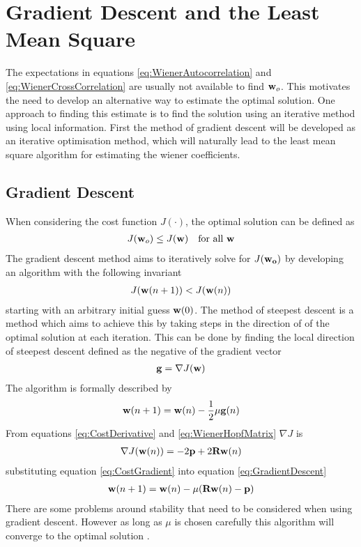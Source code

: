 \section{Gradient Descent and the Least Mean Square}
The expectations in equations \ref{eq:WienerAutocorrelation} %
and \ref{eq:WienerCrossCorrelation} are usually not %
available to find $\bold{w}_{o}$. This motivates the %
need to develop an alternative way to estimate the %
optimal solution. One approach to finding this estimate %
is to find the solution using an iterative method using %
local information. First the method of gradient descent will be %
developed as an iterative optimisation method, which will naturally %
lead to the least mean square algorithm for estimating the wiener %
coefficients. 
\subsection{Gradient Descent}
When considering the cost function $J(\cdot)$, %
the optimal solution can be defined as
\begin{align}
	J(\bold{w}_{o}) \leq J(\bold{w})\quad
	\text{for all }\bold{w}
\end{align}
The gradient descent method aims to iteratively %
solve for $J(\bold{w_{o}})$ by developing an %
algorithm with the following invariant
\begin{align}
	J(\bold{w}(n+1)) < J(\bold{w}(n))
\end{align}
starting with an arbitrary initial guess $\bold{w}(0)$. %
The method of steepest descent is a method which aims %
to achieve this by taking steps in the direction of %
of the optimal solution at each iteration. This can %
be done by finding the local direction of steepest %
descent defined as the negative of the gradient vector %
\begin{align}
	\bold{g} = \nabla J(\bold{w})
\end{align}
The algorithm is formally described by
\begin{align}
	\bold{w}(n+1) = \bold{w}(n) - \frac{1}{2}
	\mu\bold{g}(n)
	\label{eq:GradientDescent}
\end{align}
From equations \ref{eq:CostDerivative} and %
\ref{eq:WienerHopfMatrix} $\nabla J$ is
\begin{align}
	\nabla J(\bold{w}(n)) = 
	-2\bold{p} + 2\bold{R}\bold{w}(n)
	\label{eq:CostGradient}
\end{align}
substituting equation \ref{eq:CostGradient} into %
equation \ref{eq:GradientDescent}
\begin{align}
	\bold{w}(n+1) = \bold{w}(n) - \mu(
	\bold{R}\bold{w}(n) - \bold{p})
	\label{eq:WienerGradientDescent}
\end{align}
There are some problems around stability that %
need to be considered when using gradient descent. %
However as long as $\mu$ is chosen carefully this %
algorithm will converge to the optimal solution \cite{Hay02}.
